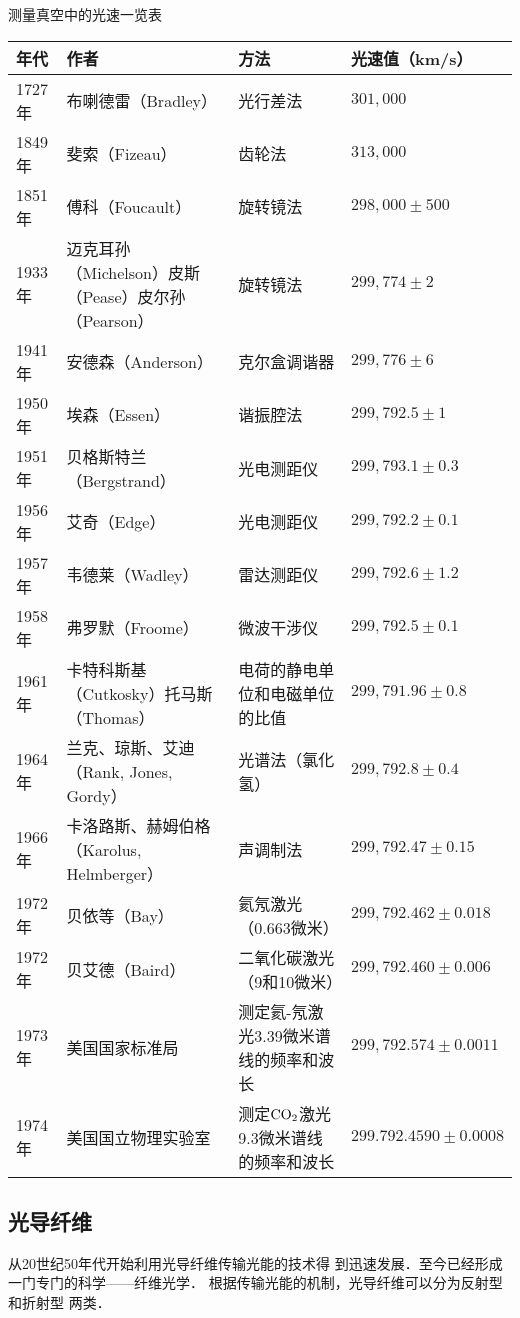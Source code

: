 测量真空中的光速一览表
\begin{center}
    \begin{tabular}{lp{}p{}l}
\hline
年代&作者&方法&光速值（km/s）\\
\hline
1727年&布喇德雷（Bradley）&光行差法& $301,000$\\
1849年&斐索（Fizeau）&齿轮法& $313,000$\\
1851年&傅科（Foucault）&旋转镜法& $298,000\pm 500$\\
1933年&迈克耳孙（Michelson）皮斯（Pease）皮尔孙（Pearson）   &旋转镜法& $299,774\pm 2$\\
1941年&安德森（Anderson）&克尔盒调谐器&$299,776\pm 6$\\
1950年&埃森（Essen）&谐振腔法&$299,792.5\pm 1$\\
1951年&贝格斯特兰（Bergstrand）&光电测距仪&$299,793.1\pm 0.3$\\
1956年&艾奇（Edge）&光电测距仪&$299,792.2\pm 0.1$\\
1957年&韦德莱（Wadley）&雷达测距仪&$299,792.6\pm 1.2$\\
1958年&弗罗默（Froome）&微波干涉仪&$299,792.5\pm 0.1$\\
1961年&卡特科斯基（Cutkosky）托马斯（Thomas）&电荷的静电单位和电磁单位的比值&$299,791.96\pm 0.8$\\
1964年&
兰克、琼斯、艾迪（Rank, Jones, Gordy）&光谱法（氯化氢）&$299,792.8\pm 0.4$\\
1966年&卡洛路斯、赫姆伯格（Karolus, Helmberger）&声调制法&$299,792.47\pm 0.15$\\
1972年&贝依等（Bay）&氦氖激光（0.663微米）&$299,792.462\pm 0.018$\\
1972年&贝艾德（Baird）&二氧化碳激光（9和10微米）&$299,792.460\pm 0.006$\\
1973年&美国国家标准局&测定氦-氖激光3.39微米谱线的频率和波长&$299,792.574\pm 0.0011$\\
1974年&美国国立物理实验室&测定$\rm CO_2$激光9.3微米谱线的频率和波长&$299.792.4590\pm 0.0008$\\
\hline
    \end{tabular}
\end{center}


\subsection{光导纤维}

从20世纪50年代开始利用光导纤维传输光能的技术得
到迅速发展．至今已经形成一门专门的科学——纤维光学．
根据传输光能的机制，光导纤维可以分为反射型和折射型
两类．

